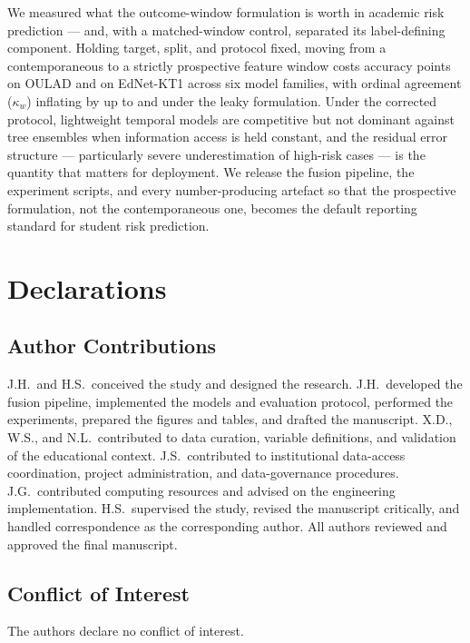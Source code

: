 \documentclass[sn-mathphys,Numbered]{sn-jnl}
\begin{document}
We measured what the outcome-window formulation is worth in academic risk prediction --- and, with a matched-window control, separated its label-defining component. Holding target, split, and protocol fixed, moving from a contemporaneous to a strictly prospective feature window costs \gapOULADaccRange{} accuracy points on OULAD and \gapEdNetaccRange{} on EdNet-KT1 across six model families, with ordinal agreement ($\kappa_w$) inflating by up to \gapOULADqwkMax{} and \gapEdNetqwkMax{} under the leaky formulation. Under the corrected protocol, lightweight temporal models are competitive but not dominant against tree ensembles when information access is held constant, and the residual error structure --- particularly severe underestimation of high-risk cases --- is the quantity that matters for deployment. We release the fusion pipeline, the experiment scripts, and every number-producing artefact so that the prospective formulation, not the contemporaneous one, becomes the default reporting standard for student risk prediction.



\section*{Declarations}

\subsection*{Author Contributions}
J.H.\ and H.S.\ conceived the study and designed the research. J.H.\ developed the fusion pipeline, implemented the models and evaluation protocol, performed the experiments, prepared the figures and tables, and drafted the manuscript. X.D., W.S., and N.L.\ contributed to data curation, variable definitions, and validation of the educational context. J.S.\ contributed to institutional data-access coordination, project administration, and data-governance procedures. J.G.\ contributed computing resources and advised on the engineering implementation. H.S.\ supervised the study, revised the manuscript critically, and handled correspondence as the corresponding author. All authors reviewed and approved the final manuscript.

\subsection*{Conflict of Interest}
The authors declare no conflict of interest.
\end{document}
